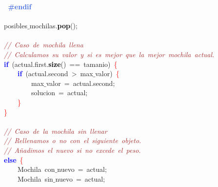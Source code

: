 \mbox{}\textbf{\textcolor{RoyalBlue}{\ \ \ \ \ \ \ \ \#endif}} \\
\mbox{} \\
\mbox{}\ \ \ \ \ \ \ \ posibles$\_$mochilas\textcolor{BrickRed}{.}\textbf{\textcolor{Black}{pop}}\textcolor{BrickRed}{();} \\
\mbox{} \\
\mbox{}\ \ \ \ \ \ \ \ \textit{\textcolor{Brown}{//\ Caso\ de\ mochila\ llena}} \\
\mbox{}\ \ \ \ \ \ \ \ \textit{\textcolor{Brown}{//\ Calculamos\ su\ valor\ y\ si\ es\ mejor\ que\ la\ mejor\ mochila\ actual.}} \\
\mbox{}\ \ \ \ \ \ \ \ \textbf{\textcolor{Blue}{if}}\ \textcolor{BrickRed}{(}actual\textcolor{BrickRed}{.}first\textcolor{BrickRed}{.}\textbf{\textcolor{Black}{size}}\textcolor{BrickRed}{()}\ \textcolor{BrickRed}{==}\ tamanio\textcolor{BrickRed}{)}\ \textcolor{Red}{\{} \\
\mbox{}\ \ \ \ \ \ \ \ \ \ \ \ \textbf{\textcolor{Blue}{if}}\ \textcolor{BrickRed}{(}actual\textcolor{BrickRed}{.}second\ \textcolor{BrickRed}{\textgreater{}}\ max$\_$valor\textcolor{BrickRed}{)}\ \textcolor{Red}{\{} \\
\mbox{}\ \ \ \ \ \ \ \ \ \ \ \ \ \ \ \ max$\_$valor\ \textcolor{BrickRed}{=}\ actual\textcolor{BrickRed}{.}second\textcolor{BrickRed}{;} \\
\mbox{}\ \ \ \ \ \ \ \ \ \ \ \ \ \ \ \ solucion\ \textcolor{BrickRed}{=}\ actual\textcolor{BrickRed}{;} \\
\mbox{}\ \ \ \ \ \ \ \ \ \ \ \ \textcolor{Red}{\}} \\
\mbox{}\ \ \ \ \ \ \ \ \textcolor{Red}{\}} \\
\mbox{} \\
\mbox{}\ \ \ \ \ \ \ \ \textit{\textcolor{Brown}{//\ Caso\ de\ la\ mochila\ sin\ llenar}} \\
\mbox{}\ \ \ \ \ \ \ \ \textit{\textcolor{Brown}{//\ Rellenamos\ o\ no\ con\ el\ siguiente\ objeto.}} \\
\mbox{}\ \ \ \ \ \ \ \ \textit{\textcolor{Brown}{//\ Añadimos\ el\ nuevo\ si\ no\ excede\ el\ peso.}} \\
\mbox{}\ \ \ \ \ \ \ \ \textbf{\textcolor{Blue}{else}}\ \textcolor{Red}{\{} \\
\mbox{}\ \ \ \ \ \ \ \ \ \ \ \ \textcolor{TealBlue}{Mochila}\ con$\_$nuevo\ \textcolor{BrickRed}{=}\ actual\textcolor{BrickRed}{;} \\
\mbox{}\ \ \ \ \ \ \ \ \ \ \ \ \textcolor{TealBlue}{Mochila}\ sin$\_$nuevo\ \textcolor{BrickRed}{=}\ actual\textcolor{BrickRed}{;} \\
